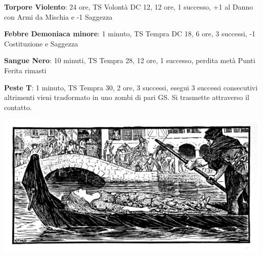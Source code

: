 \begin{multicols}{2}
\textbf{Torpore Violento}: 24 ore, TS Volontà DC 12, 12 ore, 1 successo, +1 al Danno con Armi da Mischia e -1 Saggezza

\textbf{Febbre Demoniaca minore}: 1 minuto, TS Tempra DC 18, 6 ore, 3 successi, -1 Costituzione e Saggezza

\textbf{Sangue Nero}: 10 minuti, TS Tempra 28, 12 ore, 1 successo, perdita metà Punti Ferita rimasti

\textbf{Peste T}: 1 minuto, TS Tempra 30, 2 ore, 3 successi, esegui 3 successi consecutivi altrimenti vieni trasformato in uno zombi di pari GS. Si trasmette attraverso il contatto.

\end{multicols}

\vfill

\begin{center}
\includegraphics[width=0.5\linewidth]{immagini/funeralebarca.png}
\end{center}



\pagebreak


